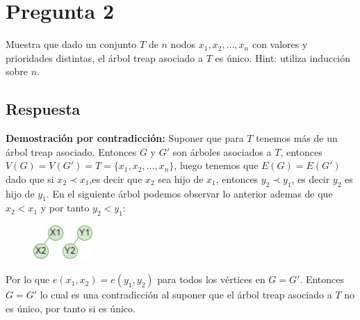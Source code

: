 \section*{Pregunta 2}
\noindent Muestra que dado un conjunto $T$ de $n$ nodos $x_1, x_2, \dots, x_n$ con valores y prioridades distintas, el árbol treap asociado a $T$ es único. Hint: utiliza inducción sobre $n$.

\subsection*{Respuesta}

\textbf{Demostración por contradicción:}
Suponer que para $T$ tenemos más de un árbol treap asociado. Entonces $G$ y $G'$ son árboles asociados a $T$, entonces $V(G)=V(G')=T=\{x_1, x_2, \dots, x_n\}$, luego tenemos que $E(G)=E(G')$ dado que si $x_2 \prec x_1$,es decir que $x_2$ sea hijo de $x_1$, entonces $y_2 \prec y_1$, es decir $y_2$ es hijo de $y_1$. En el siguiente árbol podemos observar lo anterior ademas de que $x_2 < x_1$ y por tanto $y_2 < y_1$:

\begin{figure}[h!]
    \centering
    \includegraphics[width=0.2\textwidth]{t1-3.jpg}
\end{figure}
Por lo que $e(x_1,x_2)=e(y_1,y_2)$ para todos los vértices en $G=G'$. Entonces $G=G'$ lo cual es una contradicción al suponer que el árbol treap asociado a $T$ no es único, por tanto si es único. 
\bigskip
